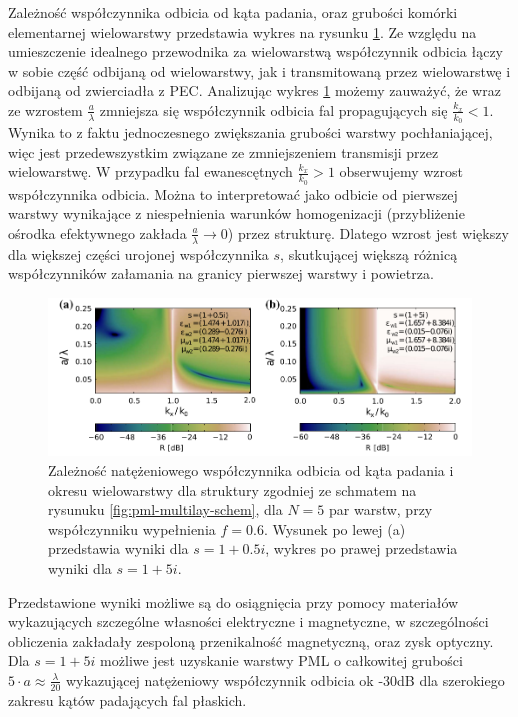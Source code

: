 Zależność współczynnika odbicia od kąta padania, oraz grubości komórki elementarnej wielowarstwy przedstawia wykres na rysunku \ref{fig:oqe3}. Ze względu na umieszczenie idealnego przewodnika za wielowarstwą współczynnik odbicia łączy w sobie część odbijaną od wielowarstwy, jak i transmitowaną przez wielowarstwę i odbijaną od zwierciadła z PEC. Analizując wykres \ref{fig:oqe3} możemy zauważyć, że wraz ze wzrostem $\frac{a}{\lambda}$ zmniejsza się współczynnik odbicia fal propagujących się $\frac{k_x}{k_0}<1$. Wynika to z faktu jednoczesnego zwiększania grubości warstwy pochłaniającej, więc jest przedewszystkim związane ze zmniejszeniem transmisji przez wielowarstwę. W przypadku fal ewanescętnych $\frac{k_x}{k_0}>1$ obserwujemy wzrost współczynnika odbicia. Można to interpretować jako odbicie od pierwszej warstwy wynikające z niespełnienia warunków homogenizacji (przybliżenie ośrodka efektywnego zakłada $\frac{a}{\lambda} \to 0$) przez strukturę. Dlatego wzrost jest większy dla większej części urojonej współczynnika $s$, skutkującej większą różnicą współczynników załamania na granicy pierwszej warstwy i powietrza.

\begin{figure}[tb]
	\includegraphics[width=\textwidth]{images/pml/fig3.png}
	\caption{Zależność natężeniowego współczynnika odbicia od kąta padania i okresu wielowarstwy dla struktury zgodniej ze schmatem na rysunuku \ref{fig:pml-multilay-schem}, dla $N=5$ par warstw, przy współczynniku wypełnienia $f=0.6$. Wysunek po lewej (a) przedstawia wyniki dla $s=1+0.5i$, wykres po prawej przedstawia wyniki dla $s=1+5i$.}
	\label{fig:oqe3}
\end{figure}

Przedstawione wyniki możliwe są do osiągnięcia przy pomocy materiałów wykazujących szczególne własności elektryczne i magnetyczne, w szczególności obliczenia zakładały zespoloną przenikalność magnetyczną, oraz zysk optyczny. Dla $s=1+5i$ możliwe jest uzyskanie warstwy PML o całkowitej grubości $5\cdot a \approx \frac{\lambda}{20}$ wykazującej natężeniowy współczynnik odbicia ok -30dB dla szerokiego zakresu kątów padających fal płaskich.

